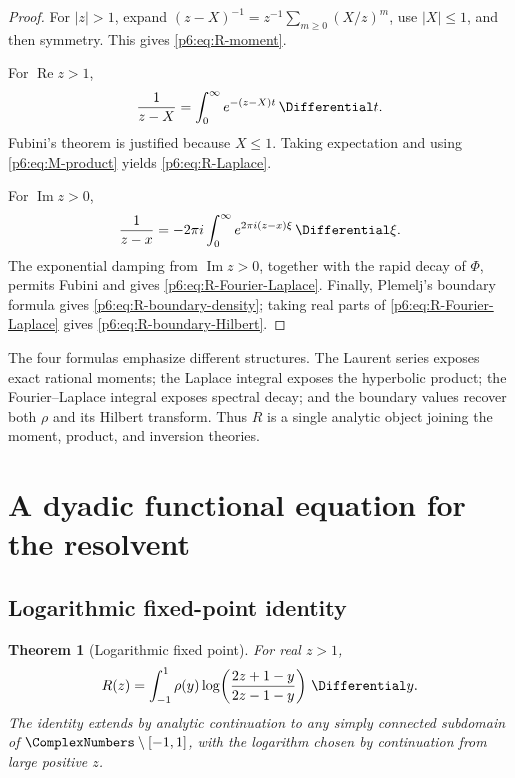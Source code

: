 \documentclass[11pt]{article}
\newtheorem{theorem}{Theorem}[section]
\theoremstyle{definition}
\theoremstyle{remark}
\begin{document}
\begin{proof}
For \(|z|>1\), expand \((z-X)^{-1}=z^{-1}\sum_{m\ge0}(X/z)^m\), use
\(|X|\le1\), and then symmetry.  This gives \eqref{p6:eq:R-moment}.

For \(\operatorname{Re}z>1\),
\[
 \frac1{z-X}=\int_0^{\infty}e^{-(z-X)t}\,\Differential t.
\]
Fubini's theorem is justified because \(X\le1\).  Taking expectation and using
\eqref{p6:eq:M-product} yields \eqref{p6:eq:R-Laplace}.

For \(\operatorname{Im}z>0\),
\[
 \frac1{z-x}=-2\pi i\int_0^{\infty}e^{2\pi i(z-x)\xi}\,\Differential\xi.
\]
The exponential damping from \(\operatorname{Im}z>0\), together with the rapid decay of
\(\Phi\), permits Fubini and gives \eqref{p6:eq:R-Fourier-Laplace}.  Finally,
Plemelj's boundary formula gives \eqref{p6:eq:R-boundary-density}; taking real parts of
\eqref{p6:eq:R-Fourier-Laplace} gives \eqref{p6:eq:R-boundary-Hilbert}.
\end{proof}

\begin{remark}
The four formulas emphasize different structures.  The Laurent series exposes exact
rational moments; the Laplace integral exposes the hyperbolic product; the Fourier--Laplace
integral exposes spectral decay; and the boundary values recover both \(\rho\) and its
Hilbert transform.  Thus \(R\) is a single analytic object joining the moment, product,
and inversion theories.
\end{remark}

\section{A dyadic functional equation for the resolvent}

\subsection{Logarithmic fixed-point identity}

\begin{theorem}[Logarithmic fixed point]\label{p6:thm:R-log-fixed}
For real \(z>1\),
\begin{equation}
 R(z)=\int_{-1}^{1}\rho(y)
 \log\!\left(\frac{2z+1-y}{2z-1-y}\right)\,\Differential y.           \label{p6:eq:R-log-fixed}
\end{equation}
The identity extends by analytic continuation to any simply connected subdomain of
\(\ComplexNumbers\setminus[-1,1]\), with the logarithm chosen by continuation from large positive
\(z\).
\end{theorem}
\end{document}
